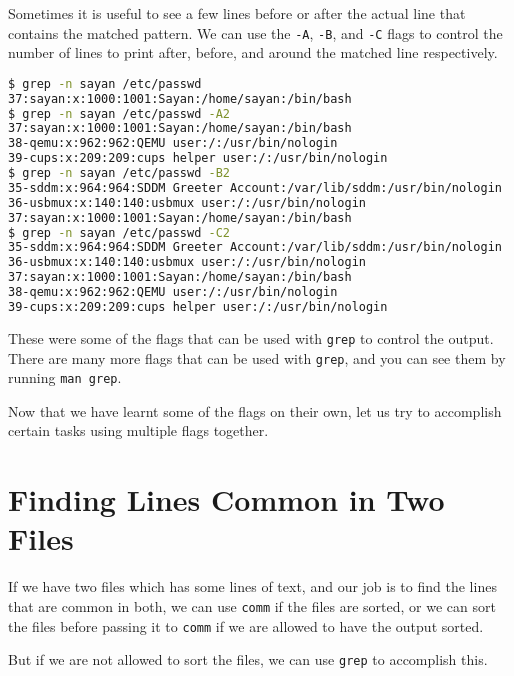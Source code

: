 Sometimes it is useful to see a few lines before or after the actual line that
contains the matched pattern. We can use the \lstinline|-A|, \lstinline|-B|, and \lstinline|-C| flags to control the number of lines to print after, before, and around the matched line respectively.

\begin{lstlisting}[language=bash]
$ grep -n sayan /etc/passwd
37:sayan:x:1000:1001:Sayan:/home/sayan:/bin/bash
$ grep -n sayan /etc/passwd -A2
37:sayan:x:1000:1001:Sayan:/home/sayan:/bin/bash
38-qemu:x:962:962:QEMU user:/:/usr/bin/nologin
39-cups:x:209:209:cups helper user:/:/usr/bin/nologin
$ grep -n sayan /etc/passwd -B2
35-sddm:x:964:964:SDDM Greeter Account:/var/lib/sddm:/usr/bin/nologin
36-usbmux:x:140:140:usbmux user:/:/usr/bin/nologin
37:sayan:x:1000:1001:Sayan:/home/sayan:/bin/bash
$ grep -n sayan /etc/passwd -C2
35-sddm:x:964:964:SDDM Greeter Account:/var/lib/sddm:/usr/bin/nologin
36-usbmux:x:140:140:usbmux user:/:/usr/bin/nologin
37:sayan:x:1000:1001:Sayan:/home/sayan:/bin/bash
38-qemu:x:962:962:QEMU user:/:/usr/bin/nologin
39-cups:x:209:209:cups helper user:/:/usr/bin/nologin
\end{lstlisting}

These were some of the flags that can be used with \lstinline|grep| to control the output. There are many more flags that can be used with \lstinline|grep|, and you can see them by running \lstinline|man grep|.

Now that we have learnt some of the flags on their own, let us try to accomplish certain tasks using multiple flags together.

\section{Finding Lines Common in Two Files}

If we have two files which has some lines of text, and our job is to find
the lines that are common in both, we can use \lstinline|comm| if the files
are sorted, or we can sort the files before passing it to \lstinline|comm| if we are allowed to have the output sorted.

But if we are not allowed to sort the files, we can use \lstinline|grep| to accomplish this.

